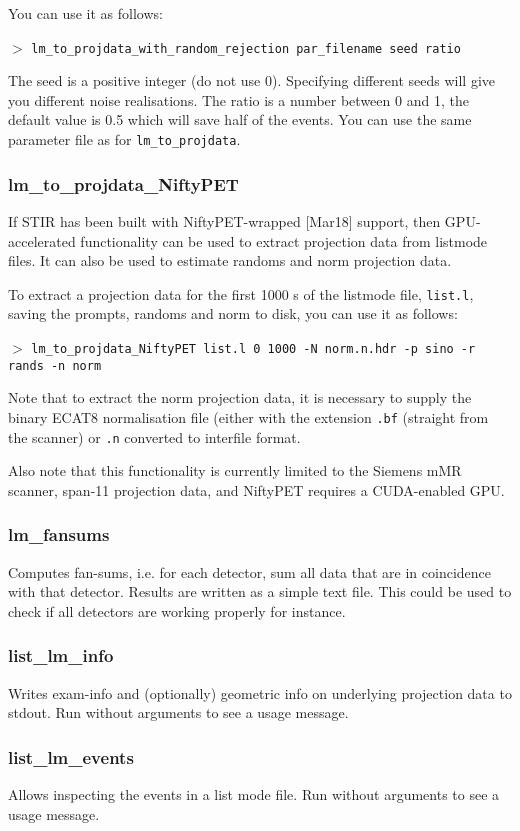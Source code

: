 \documentclass{article}
\newcommand{\cmdline}[1]{\par \noindent $>$ \texttt{#1}\par}
\begin{document}
You can use it as follows:

\cmdline{lm\_to\_projdata\_with\_random\_rejection par\_filename seed ratio}

The seed is a positive integer (do not use $0$). Specifying different seeds will give you different noise realisations. The ratio is a number between 0 and 1, the default value is 0.5 which will save half of the events.
You can use the same parameter file as for \texttt{lm\_to\_projdata}.

\subsubsection{
lm\_to\_projdata\_NiftyPET}
If STIR has been built with NiftyPET-wrapped [Mar18] support, then GPU-accelerated functionality can be used to extract projection data from listmode files. It can also be used to estimate randoms and norm projection data.

To extract a projection data for the first 1000 s of the listmode file, \texttt{list.l}, saving the prompts, randoms and norm to disk, you can use it as follows:

\cmdline{lm\_to\_projdata\_NiftyPET list.l 0 1000 -N norm.n.hdr -p sino -r rands -n norm}

Note that to extract the norm projection data, it is necessary to supply the binary ECAT8 normalisation file (either with the extension \texttt{.bf} (straight from the scanner) or \texttt{.n} converted to interfile format.

Also note that this functionality is currently limited to the Siemens mMR scanner, span-11 projection data, and NiftyPET requires a CUDA-enabled GPU.

\subsubsection{
lm\_fansums}
Computes fan-sums, i.e. for each detector, sum all data that are in coincidence with that detector.
Results are written as a simple text file. This could be used to check if all detectors are working
properly for instance.

\subsubsection{
list\_lm\_info}
Writes exam-info and (optionally) geometric info on underlying projection data to stdout.
Run without arguments to see a usage message.

\subsubsection{
list\_lm\_events}
Allows inspecting the events in a list mode file. Run without arguments to see a usage message.
\end{document}
